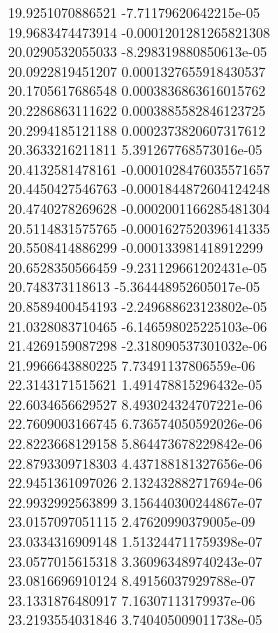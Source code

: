{19.9251070886521 -7.71179620642215e-05 \\
19.9683474473914 -0.0001201281265821308 \\
20.0290532055033 -8.298319880850613e-05 \\
20.0922819451207 0.0001327655918430537 \\
20.1705617686548 0.0003836863616015762 \\
20.2286863111622 0.0003885582846123725 \\
20.2994185121188 0.0002373820607317612 \\
20.3633216211811 5.391267768573016e-05 \\
20.4132581478161 -0.0001028476035571657 \\
20.4450427546763 -0.0001844872604124248 \\
20.4740278269628 -0.0002001166285481304 \\
20.5114831575765 -0.0001627520396141335 \\
20.5508414886299 -0.000133981418912299 \\
20.6528350566459 -9.231129661202431e-05 \\
20.748373118613 -5.364448952605017e-05 \\
20.8589400454193 -2.249688623123802e-05 \\
21.0328083710465 -6.146598025225103e-06 \\
21.4269159087298 -2.318090537301032e-06 \\
21.9966643880225 7.73491137806559e-06 \\
22.3143171515621 1.491478815296432e-05 \\
22.6034656629527 8.493024324707221e-06 \\
22.7609003166745 6.736574050592026e-06 \\
22.8223668129158 5.864473678229842e-06 \\
22.8793309718303 4.437188181327656e-06 \\
22.9451361097026 2.132432882717694e-06 \\
22.9932992563899 3.156440300244867e-07 \\
23.0157097051115 2.47620990379005e-09 \\
23.0334316909148 1.513244711759398e-07 \\
23.0577015615318 3.360963489740243e-07 \\
23.0816696910124 8.49156037929788e-07 \\
23.1331876480917 7.16307113179937e-06 \\
23.2193554031846 3.740405009011738e-05 \\
}
